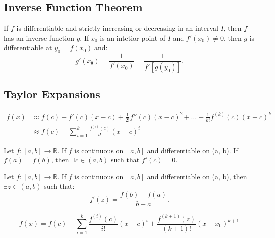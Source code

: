 \begin{example*}
\end{example*}


\subsection{Inverse Function Theorem}

\begin{theorem}
    If $f$ is differentiable and strictly increasing or decreasing in an interval $I$, then $f$ has an inverse function $g$. If $x_0$ is an intetior point of $I$ and $f'(x_0) \neq 0$, then $g$ is differentiable at $y_0 = f(x_0)$ and: \begin{equation*}
        g'(x_0) = \frac{1}{f'(x_0)} = \frac{1}{f'[g(y_0)]}.
    \end{equation*}
\end{theorem}

\begin{example*}
\end{example*}

\subsection{Taylor Expansions}

\begin{align*}
    f(x) & \approx f(c) + f'(c)(x-c) + \frac{1}{2!}f''(c)(x-c)^{2} + \dots + \frac{1}{k!}f ^{(k)}(c)(x-c)^{k} \\
         & \approx f(c) + \sum_{i=1}^{k}\frac{f ^{(i)}(c)}{i!}(x-c)^{i}
\end{align*}

\begin{theorem}
    Let $f: [a, b] \to \mathbb{R}$. If $f$ is continuous on $[a, b]$ and differentiable on (a, b). If $f(a)=f(b)$, then $\exists c \in (a,b)$ such that $f'(c) = 0$.
\end{theorem}

\begin{theorem}
    Let $f: [a, b] \to \mathbb{R}$. If $f$ is continuous on $[a, b]$ and differentiable on (a, b), then $\exists z \in (a,b)$ such that:
    \begin{equation*}
        f'(z) = \frac{f(b)- f(a)}{b-a}.
    \end{equation*}
\end{theorem}

\begin{proposition}
    \begin{equation*}
        f(x) = f(c) + \sum_{i=1}^{k}\frac{f ^{(i)}(c)}{i!}(x-c)^{i} + \frac{f ^{(k+1)}(z)}{(k+1)!}(x-x_0)^{k+1}
    \end{equation*}
\end{proposition}


